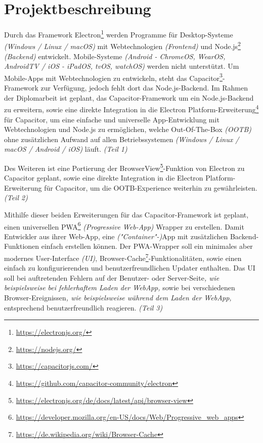 \section{Projektbeschreibung}

Durch das Framework Electron\footnote{\url{https://electronjs.org/}} werden Programme für Desktop-Systeme \textit{(Windows / Linux / macOS)} mit Webtechnologien \textit{(Frontend)} und Node.js\footnote{\url{https://nodejs.org/}} \textit{(Backend)} entwickelt.
Mobile-Systeme \textit{(Android - ChromeOS, WearOS, AndroidTV / iOS - iPadOS, tvOS, watchOS)} werden nicht unterstützt.
Um Mobile-Apps mit Webtechnologien zu entwickeln, steht das Capacitor\footnote{\url{https://capacitorjs.com/}}-Framework zur Verfügung, jedoch fehlt dort das Node.js-Backend.
Im Rahmen der Diplomarbeit ist geplant, das Capacitor-Framework um ein Node.js-Backend zu erweitern, sowie eine direkte Integration in die Electron Platform-Erweiterung\footnote{\url{https://github.com/capacitor-community/electron}} für Capacitor, um eine einfache und universelle App-Entwicklung mit Webtechnologien und Node.js zu ermöglichen, welche Out-Of-The-Box \textit{(OOTB)} ohne zusätzlichen Aufwand auf allen Betriebssystemen \textit{(Windows / Linux / macOS / Android / iOS)} läuft.
\textit{(Teil 1)}

Des Weiteren ist eine Portierung der BrowserView\footnote{\url{https://electronjs.org/de/docs/latest/api/browser-view}}-Funktion von Electron zu Capacitor geplant, sowie eine direkte Integration in die Electron Platform-Erweiterung für Capacitor, um die OOTB-Experience weiterhin zu gewährleisten.
\textit{(Teil 2)}

Mithilfe dieser beiden Erweiterungen für das Capacitor-Framework ist geplant, einen universellen PWA\footnote{\url{https://developer.mozilla.org/en-US/docs/Web/Progressive_web_apps}} \textit{(Progressive Web-App)} Wrapper zu erstellen.
Damit Entwickler aus ihrer Web-App, eine \textit{("Container"-)}App mit zusätzlichen Backend-Funktionen einfach erstellen können.
Der PWA-Wrapper soll ein minimales aber modernes User-Interface \textit{(UI)}, Browser-Cache\footnote{\url{https://de.wikipedia.org/wiki/Browser-Cache}}-Funktionalitäten, sowie einen einfach zu konfigurierenden und benutzerfreundlichen Updater enthalten.
Das UI soll bei auftretenden Fehlern auf der Benutzer- oder Server-Seite\textit{, wie beispielsweise bei fehlerhaftem Laden der WebApp,} sowie bei verschiedenen Browser-Ereignissen\textit{, wie beispielsweise während dem Laden der WebApp,} entsprechend benutzerfreundlich reagieren.
\textit{(Teil 3)}
